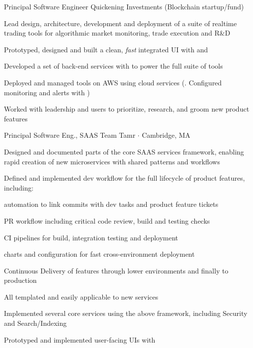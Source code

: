 \documentclass[11.5pt]{article}
\begin{document}
\begin{multicols}{2}
\raggedcolumns

{Principal Software Engineer}
{Quickening Investments (Blockchain startup/fund)}{%
\begin{itemize*}
  \setlength\itemsep{0.4em}
  \item Lead design, architecture, development and deployment of a suite of realtime trading tools for algorithmic market monitoring, trade execution and R\&D
  \item Prototyped, designed and built a clean, \textit{fast} integrated UI with  and 
  \item Developed a set of back-end services with  to power the full suite of tools
  \item Deployed and managed tools on AWS using cloud services (. Configured monitoring and alerts with )
  \item Worked with leadership and users to prioritize, research, and groom new product features
\end{itemize*}
}

\vfill\null
\columnbreak

{Principal Software Eng., SAAS Team}
{Tamr $\cdot$ Cambridge, MA}{%
\begin{itemize*}
  \setlength\itemsep{0.4em}
  \item Designed and documented parts of the core SAAS services framework, enabling rapid creation of new microservices with shared patterns and workflows
  \item Defined and implemented dev workflow for the full lifecycle of product features, including:
  \vspace{0.25in}
  \begin{itemize*}
    \item {} automation to link commits with dev tasks and product feature tickets
    \item {} PR workflow including critical code review, build and testing checks
    \item {} CI pipelines for build, integration testing and deployment
    \item {} charts and configuration for fast cross-environment deployment
    \item Continuous Delivery of features through lower environments and finally to production
    \item All templated and easily applicable to new services
  \end{itemize*}
  \item Implemented several core services using the above framework, including Security and Search/Indexing
  \item Prototyped and implemented user-facing UIs with 
\end{itemize*}
}


\end{multicols}
\end{document}
